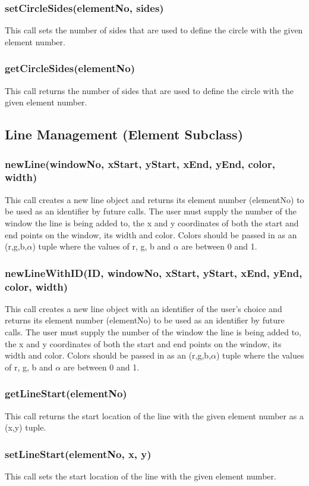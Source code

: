 \documentclass{acm_proc_article-sp}
\begin{document}
\subsubsection{setCircleSides(elementNo, sides)}
This call sets the number of sides that are used to define the circle with the given element number.
\subsubsection{getCircleSides(elementNo)}
This call returns the number of sides that are used to define the circle with the given element number.
\subsection{Line Management (Element Subclass)}
\subsubsection{newLine(windowNo, xStart, yStart, xEnd, yEnd, color, width)}
This call creates a new line object and returns its element number (elementNo) to be used as an identifier by future calls. The user must supply the number of the window the line is being added to, the x and y coordinates of both the start and end points on the window, its width and color. Colors should be passed in as an (r,g,b,$\alpha$) tuple where the values of r, g, b and $\alpha$ are between 0 and 1.
\subsubsection{newLineWithID(ID, windowNo, xStart, yStart, xEnd, yEnd, color, width)}
This call creates a new line object with an identifier of the user's choice and returns its element number (elementNo) to be used as an identifier by future calls. The user must supply the number of the window the line is being added to, the x and y coordinates of both the start and end points on the window, its width and color. Colors should be passed in as an (r,g,b,$\alpha$) tuple where the values of r, g, b and $\alpha$ are between 0 and 1.
\subsubsection{getLineStart(elementNo)}
This call returns the start location of the line with the given element number as a (x,y) tuple.
\subsubsection{setLineStart(elementNo, x, y)}
This call sets the start location of the line with the given element number.
\end{document}
